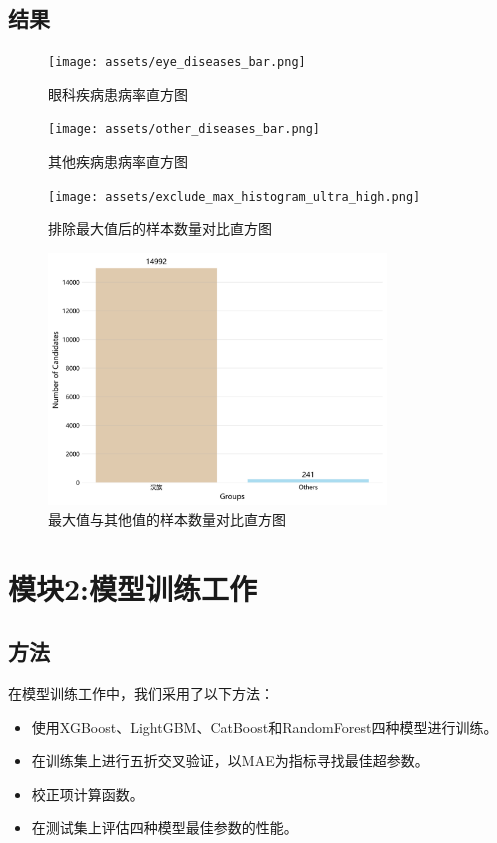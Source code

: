 \documentclass[UTF8]{report}
\theoremstyle{MyLineTheoremStyle} %
\theoremstyle{MyBlockTheoremStyle} %
\theoremstyle{MySubsubsectionStyle} %
\begin{document}
\subsection*{结果}
\begin{figure}[H]
    \centering
    \texttt{[image: assets/eye\_diseases\_bar.png]}
    \caption{眼科疾病患病率直方图}
    \label{fig:eye_diseases_bar}
\end{figure}

\begin{figure}[H]
    \centering
    \texttt{[image: assets/other\_diseases\_bar.png]}
    \caption{其他疾病患病率直方图}
    \label{fig:other_diseases_bar}
\end{figure}

\begin{figure}[H]
    \centering
    \texttt{[image: assets/exclude\_max\_histogram\_ultra\_high.png]}
    \caption{排除最大值后的样本数量对比直方图}
    \label{fig:exclude_max_histogram_ultra_high}
\end{figure}

\begin{figure}[H]
    \centering
    \includegraphics[width=0.8\textwidth]{assets/max_vs_others_histogram_ultra_high.png}
    \caption{最大值与其他值的样本数量对比直方图}
    \label{fig:max_vs_others_histogram_ultra_high}
\end{figure}


\section{模块2:模型训练工作}

\subsection*{方法}
在模型训练工作中，我们采用了以下方法：
\begin{itemize}
    \item 使用XGBoost、LightGBM、CatBoost和RandomForest四种模型进行训练。
    \item 在训练集上进行五折交叉验证，以MAE为指标寻找最佳超参数。
    \item 校正项计算函数。
    \item 在测试集上评估四种模型最佳参数的性能。
\end{itemize}
\end{document}
